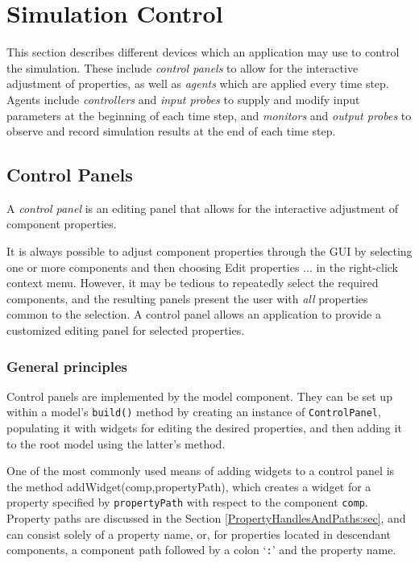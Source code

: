 
\chapter{Simulation Control}
\label{SimulationControl:sec}

This section describes different devices which an application may use
to control the simulation. These include {\it control panels} to allow
for the interactive adjustment of properties, as well as {\it agents}
which are applied every time step. Agents include {\it controllers}
and {\it input probes} to supply and modify input parameters at the
beginning of each time step, and {\it monitors} and {\it output
probes} to observe and record simulation results at the end of each
time step.

\section{Control Panels}
\label{ControlPanels:sec}

A {\it control panel} is an editing panel that allows for the
interactive adjustment of component properties.

It is always possible to adjust component properties through the GUI
by selecting one or more components and then choosing {\sf Edit
properties ...} in the right-click context menu. However, it may be
tedious to repeatedly select the required components, and the
resulting panels present the user with {\it all} properties common to
the selection.  A control panel allows an application to provide a
customized editing panel for selected properties.

\subsection{General principles}

Control panels are implemented by the
 model component.  They
can be set up within a model's {\tt build()} method by creating an
instance of {\tt ControlPanel}, populating it with widgets for editing
the desired properties, and then adding it to the root model using the
latter's
method.

One of the most commonly used means of adding widgets to a control
panel is the method
%
{addWidget(comp,propertyPath)}, which creates a widget for a property
specified by {\tt propertyPath} with respect to the component
{\tt comp}.  Property paths are discussed in the Section
\ref{PropertyHandlesAndPaths:sec}, and can consist solely of a
property name, or, for properties located in descendant components, a
component path followed by a colon `{\tt :}' and the property name.

